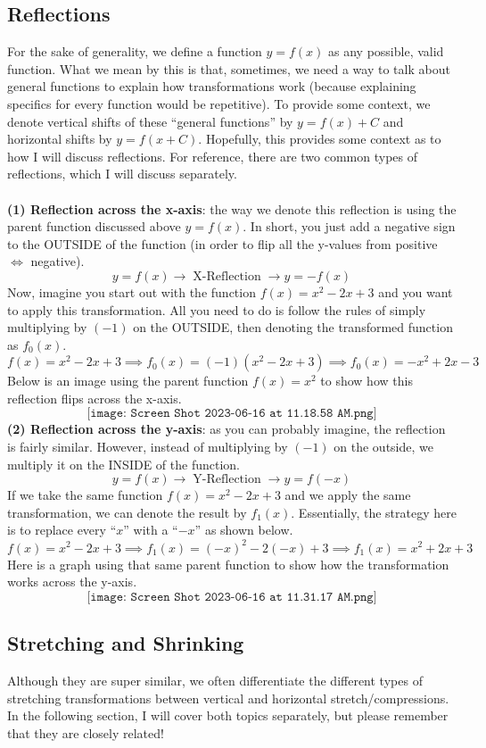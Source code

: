 \subsection{Reflections}
For the sake of generality, we define a function $y = f(x)$ as any possible, valid function. What we mean by this is that, sometimes, we need a way to talk about general functions to explain how transformations work (because explaining specifics for every function would be repetitive). To provide some context, we denote vertical shifts of these ``general functions'' by $y = f(x) + C$ and horizontal shifts by $y = f(x + C)$. Hopefully, this provides some context as to how I will discuss reflections. For reference, there are two common types of reflections, which I will discuss separately. \\
\\
\textbf{(1) Reflection across the x-axis}: the way we denote this reflection is using the parent function discussed above $y = f(x)$. In short, you just add a negative sign to the OUTSIDE of the function (in order to flip all the y-values from positive $\iff$ negative).
$$
y = f(x) \longrightarrow \;\text{X-Reflection}\; \longrightarrow y = -f(x)
$$
Now, imagine you start out with the function $f(x) = x^2 - 2x + 3$ and you want to apply this transformation. All you need to do is follow the rules of simply multiplying by $(-1)$ on the OUTSIDE, then denoting the transformed function as $f_0(x)$.
$$
f(x) = x^2 - 2x + 3 \implies f_0(x) = (-1)(x^2 -2x + 3) \implies f_0(x) = -x^2 + 2x - 3
$$
Below is an image using the parent function $f(x) = x^2$ to show how this reflection flips across the x-axis.
$$
\texttt{[image: Screen Shot 2023-06-16 at 11.18.58 AM.png]}
$$
\textbf{(2) Reflection across the y-axis}: as you can probably imagine, the reflection is fairly similar. However, instead of multiplying by $(-1)$ on the outside, we multiply it on the INSIDE of the function.
$$
y = f(x) \longrightarrow \;\text{Y-Reflection}\; \longrightarrow y = f(-x)
$$
If we take the same function $f(x) = x^2 - 2x + 3$ and we apply the same transformation, we can denote the result by $f_1(x)$. Essentially, the strategy here is to replace every ``$x$'' with a ``$-x$'' as shown below. 
$$
f(x) = x^2 - 2x + 3 \implies f_1(x) = (-x)^2 - 2(-x) + 3 \implies f_1(x) = x^2 + 2x + 3
$$
Here is a graph using that same parent function to show how the transformation works across the y-axis.
$$
\texttt{[image: Screen Shot 2023-06-16 at 11.31.17 AM.png]}
$$
\subsection{Stretching and Shrinking}
Although they are super similar, we often differentiate the different types of stretching transformations between vertical and horizontal stretch/compressions. In the following section, I will cover both topics separately, but please remember that they are closely related!
